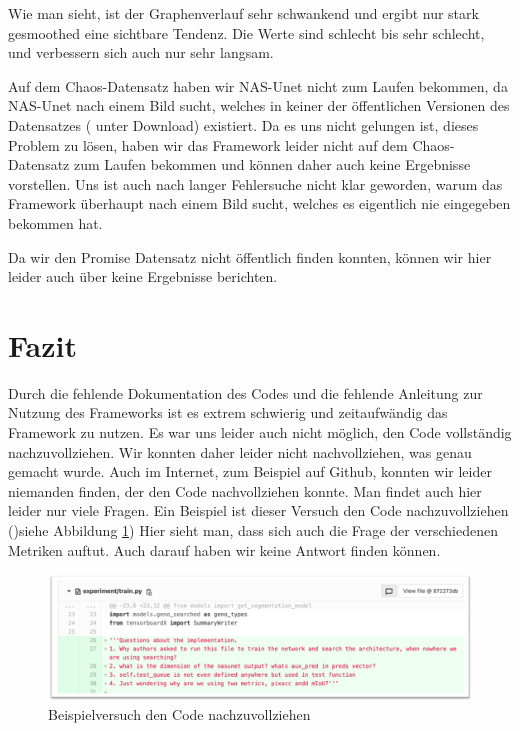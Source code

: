 Wie man sieht, ist der Graphenverlauf sehr schwankend und ergibt nur stark gesmoothed eine sichtbare Tendenz. Die Werte sind schlecht bis sehr schlecht, und verbessern sich auch nur sehr langsam.

Auf dem Chaos-Datensatz haben wir NAS-Unet nicht zum Laufen bekommen, da NAS-Unet nach einem Bild sucht, welches in keiner der öffentlichen Versionen des Datensatzes (\cite{ChaosDatensatz} unter Download) existiert. Da es uns nicht gelungen ist, dieses Problem zu lösen, haben wir das Framework leider nicht auf dem Chaos-Datensatz zum Laufen bekommen und können daher auch keine Ergebnisse vorstellen. Uns ist auch nach langer Fehlersuche nicht klar geworden, warum das Framework überhaupt nach einem Bild sucht, welches es eigentlich nie eingegeben bekommen hat. 

Da wir den Promise Datensatz nicht öffentlich finden konnten, können wir hier leider auch über keine Ergebnisse berichten.


\section{Fazit}

Durch die fehlende Dokumentation des Codes und die fehlende Anleitung zur Nutzung des Frameworks ist es extrem schwierig und zeitaufwändig das Framework zu nutzen. Es war uns leider auch nicht möglich, den Code vollständig nachzuvollziehen. Wir konnten daher leider nicht nachvollziehen, was genau gemacht wurde. Auch im Internet, zum Beispiel auf Github, konnten wir leider niemanden finden, der den Code nachvollziehen konnte. Man findet auch hier leider nur viele Fragen. Ein Beispiel ist dieser Versuch den Code nachzuvollziehen ()siehe Abbildung \ref{pic:nasUnet_FrauenhoferScreenshot}) Hier sieht man, dass sich auch die Frage der verschiedenen Metriken auftut. Auch darauf haben wir keine Antwort finden können.

\begin{figure}[H]
	
	\centering
	\includegraphics[scale=0.6]{Pictures/nasUnet/Bild6.png}
	\caption{Beispielversuch den Code nachzuvollziehen \cite{Frauenhofer_NasUnet} }
	\label{pic:nasUnet_FrauenhoferScreenshot}
\end{figure}

